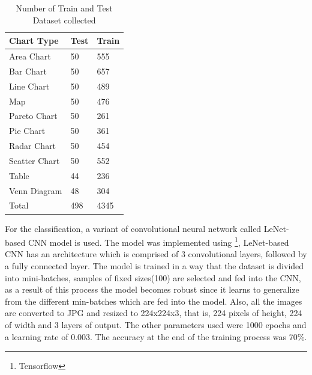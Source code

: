 \documentclass[12pt, a4paper,oneside]{report}
\begin{document}
\begin{table}[h]
	\centering {} \small
	\begin{tabular}{|p{5cm}|p{3cm}|p{3cm}|}
		
		\hline
		Chart Type & Test & Train \\ \hline
		Area Chart & 50 & 555 \\ \hline
		Bar Chart & 50 & 657 \\ \hline
		Line Chart & 50 & 489 \\ \hline
		Map & 50 & 476 \\ \hline
		Pareto Chart & 50 & 261 \\ \hline	
		Pie Chart & 50 & 361 \\ \hline
		Radar Chart & 50 & 454 \\ \hline
		Scatter Chart & 50 & 552 \\ \hline
		Table & 44 & 236 \\ \hline
		Venn Diagram & 48 & 304 \\ \hline
		Total & 498 & 4345 \\ \hline
		
	\end{tabular}
	\caption {Number of Train and Test Dataset collected}	
	\label{table:rela}
	
\end{table}
For the classification, a variant of convolutional neural network called LeNet-based CNN model is used. The model was implemented using \footnote{Tensorflow}, LeNet-based CNN has an architecture which is comprised of 3 convolutional layers, followed by a fully connected layer. The model is trained in a way that the dataset is divided into mini-batches, samples of fixed sizes(100) are selected and fed into the CNN, as a result of this process the model becomes robust since it learns to generalize from the different min-batches which are fed into the model. Also, all the images are converted to JPG and resized to 224x224x3, that is, 224 pixels of height, 224 of width and 3 layers of output. The other parameters used were 1000 epochs and a learning rate of 0.003. The accuracy at the end of the training process was 70\%.
\end{document}
